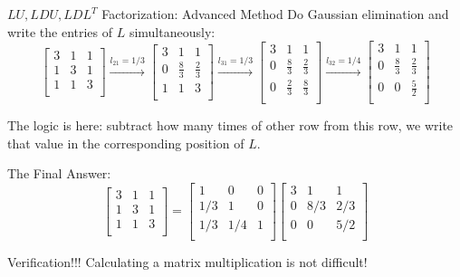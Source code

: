 \documentclass{beamer}
\begin{document}
\begin{frame}{$LU, LDU, LDL^T$ Factorization: Advanced Method}
Do Gaussian elimination and write the entries of $L$ simultaneously:
\begin{equation*}
    \left[ \begin{matrix}
        3&		1&		1\\
        1&		3&		1\\
        1&		1&		3\\
    \end{matrix} \right] \xrightarrow{l_{21}=1/3}\left[ \begin{matrix}
        3&		1&		1\\
        0&		\frac{8}{3}&		\frac{2}{3}\\
        1&		1&		3\\
    \end{matrix} \right] \xrightarrow{l_{31}=1/3}\left[ \begin{matrix}
        3&		1&		1\\
        0&		\frac{8}{3}&		\frac{2}{3}\\
        0&		\frac{2}{3}&		\frac{8}{3}\\
    \end{matrix} \right] \xrightarrow{l_{32}=1/4}\left[ \begin{matrix}
        3&		1&		1\\
        0&		\frac{8}{3}&		\frac{2}{3}\\
        0&		0&		\frac{5}{2}\\
    \end{matrix} \right]
\end{equation*}

The logic is here: subtract how many times of other row from this row, we write that value in the corresponding position of $L$.

\vspace{3pt}
The Final Answer:
\begin{equation*}
    \left[ \begin{matrix}
        3&		1&		1\\
        1&		3&		1\\
        1&		1&		3\\
    \end{matrix} \right]=\left[ \begin{matrix}
        1&		0&		0\\
        1/3&		1&		0\\
        1/3&		1/4&		1\\
    \end{matrix} \right]\left[ \begin{matrix}
        3&		1&		1\\
        0&		8/3&		2/3\\
        0&		0&		5/2\\
    \end{matrix} \right]
\end{equation*}

Verification!!! Calculating a matrix multiplication is not difficult!
\end{frame}
\end{document}

